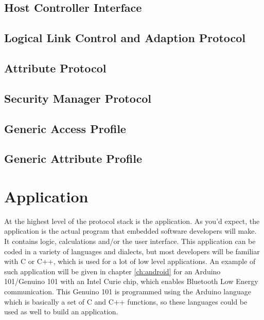 \documentclass[pdftex,a4paper,12pt,twoside]{report}
\begin{document}
\subsection{Host Controller Interface}
\label{subsec:hostHCI}

\subsection{Logical Link Control and Adaption Protocol}
\label{subsec:hostATTL2CAP}

\subsection{Attribute Protocol}
\label{subsec:hostATT}

\subsection{Security Manager Protocol}
\label{subsec:hostSMP}

\subsection{Generic Access Profile}
\label{subsec:hostGAP}

\subsection{Generic Attribute Profile}
\label{subsec:hostGATT}

\section{Application}
\label{sec:stackApplication}
At the highest level of the protocol stack is the application. As you'd expect, the application is the actual program that embedded software developers will make. It contains logic, calculations and/or the user interface. This application can be coded in a variety of languages and dialects, but most developers will be familiar with C or C++, which is used for a lot of low level applications. An example of such application will be given in chapter \ref{ch:android} for an Arduino 101/Genuino 101 with an Intel Curie chip, which enables Bluetooth Low Energy communication. This Genuino 101 is programmed using the Arduino language which is basically a set of C and C++ functions, so these languages could be used as well to build an application.
\end{document}
